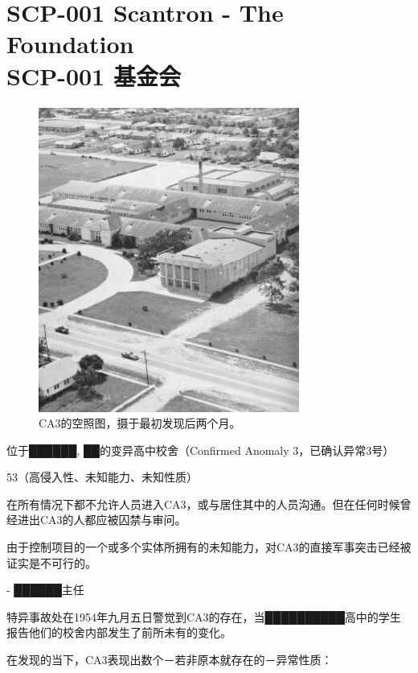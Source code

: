 \chapter[SCP-001 基金会]{
	SCP-001 Scantron - The Foundation\\
	SCP-001 基金会
}

\label{chap:SCP-001.the.foundation}

\begin{figure}[H]
	\centering
	\includegraphics[width=0.5\linewidth]{images/SCP-001-the-foundation.jpg}
	\caption*{CA3的空照图，摄于最初发现后两个月。}
\end{figure}

位于██████, ██的变异高中校舍（Confirmed Anomaly 3，已确认异常3号）

53（高侵入性、未知能力、未知性质）


在所有情况下都不允许人员进入CA3，或与居住其中的人员沟通。但在任何时候曾经进出CA3的人都应被囚禁与审问。

由于控制项目的一个或多个实体所拥有的未知能力，对CA3的直接军事突击已经被证实是不可行的。

 - ██████主任

特异事故处在1954年九月五日警觉到CA3的存在，当██████████高中的学生报告他们的校舍内部发生了前所未有的变化。

在发现的当下，CA3表现出数个－若非原本就存在的－异常性质：

